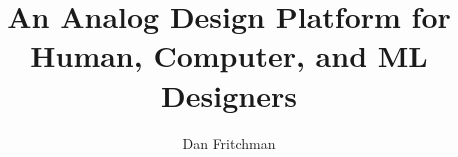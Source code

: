 \documentclass{ucbthesis}
\begin{document}
\title{An Analog Design Platform for Human, Computer, and ML Designers}
\author{Dan Fritchman}

\maketitle
\copyrightpage

\begin{abstract}
\begin{markdown}
\end{markdown}
\end{abstract}

\begin{frontmatter}

\begin{dedication}
\null\vfil
\begin{center}
\begin{markdown}
\end{markdown}
\end{center}
\vfil\null
\end{dedication}

\tableofcontents
\clearpage
\listoffigures
\clearpage
\listoftables

\begin{acknowledgements}
\begin{markdown}
\end{markdown}
\end{acknowledgements}

\end{frontmatter}

\pagestyle{headings}

\begin{markdown}
\end{markdown}

\printbibliography
\end{document}
